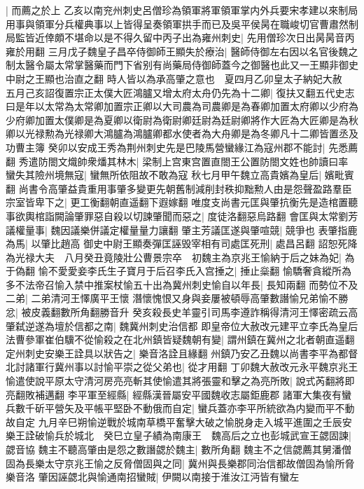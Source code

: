|{
	而薦之於上}
乙亥以南兖州刺史呂僧珍為領軍將軍領軍掌内外兵要宋孝建以來制局用事與領軍分兵權典事以上皆得呈奏領軍拱手而已及吳平侯昺在職峻切官曹肅然制局監皆近倖頗不堪命以是不得久留中丙子出為雍州刺史|{
	先用僧珍次日出昺昺音丙雍於用翻}
三月戊子魏皇子昌卒侍御師王顯失於療治|{
	醫師侍御左右因以名官後魏之制太醫令屬太常掌醫藥而門下省别有尚藥局侍御師蓋今之御醫也此又一王顯非御史中尉之王顯也治直之翻}
時人皆以為承高肇之意也　夏四月乙卯皇太子納妃大赦　五月己亥詔復置宗正太僕大匠鴻臚又增太府太舟仍先為十二卿|{
	復扶又翻五代史志曰是年以太常為太常卿加置宗正卿以大司農為司農卿是為春卿加置太府卿以少府為少府卿加置太僕卿是為夏卿以衛尉為衛尉卿廷尉為廷尉卿將作大匠為大匠卿是為秋卿以光禄勲為光禄卿大鴻臚為鴻臚卿都水使者為大舟卿是為冬卿凡十二卿皆置丞及功曹主簿}
癸卯以安成王秀為荆州刺史先是巴陵馬營蠻緣江為寇州郡不能討|{
	先悉薦翻}
秀遣防閤文熾帥衆燔其林木|{
	梁制上宫東宫置直閤王公置防閤文姓也帥讀曰率}
蠻失其險州境無寇|{
	蠻無所依阻故不敢為寇}
秋七月甲午魏立高貴嬪為皇后|{
	嬪毗賓翻}
尚書令高肇益貴重用事肇多變更先朝舊制減削封秩抑黜勲人由是怨聲盈路羣臣宗室皆卑下之|{
	更工衡翻朝直遥翻下遐嫁翻}
唯度支尚書元匡與肇抗衡先是造棺置聽事欲輿棺詣闕論肇罪惡自殺以切諫肇聞而惡之|{
	度徒洛翻惡烏路翻}
會匡與太常劉芳議權量事|{
	魏因議樂併議定權量量力讓翻}
肇主芳議匡遂與肇喧競|{
	競爭也}
表肇指鹿為馬|{
	以肇比趙高}
御史中尉王顯奏彈匡誣毁宰相有司處匡死刑|{
	處昌呂翻}
詔恕死降為光禄大夫　八月癸丑竟陵壯公曹景宗卒　初魏主為京兆王愉納于后之妹為妃|{
	為于偽翻}
愉不愛愛妾李氏生子寶月于后召李氏入宫捶之|{
	捶止橤翻}
愉驕奢貪縱所為多不法帝召愉入禁中推案杖愉五十出為冀州刺史愉自以年長|{
	長知兩翻}
而勢位不及二弟|{
	二弟清河王懌廣平王懷}
潛懷愧恨又身與妾屢被頓辱高肇數譖愉兄弟愉不勝忿|{
	被皮義翻數所角翻勝音升}
癸亥殺長史羊靈引司馬李遵詐稱得清河王懌密疏云高肇弑逆遂為壇於信都之南|{
	魏冀州刺史治信都}
即皇帝位大赦改元建平立李氏為皇后法曹參軍崔伯驥不從愉殺之在北州鎮皆疑魏朝有變|{
	謂州鎮在冀州之北者朝直遥翻}
定州刺史安樂王詮具以狀告之|{
	樂音洛詮且緣翻}
州鎮乃安乙丑魏以尚書李平為都督北討諸軍行冀州事以討愉平崇之從父弟也|{
	從才用翻}
丁卯魏大赦改元永平魏京兆王愉遣使說平原太守清河房亮亮斬其使愉遣其將張靈和擊之為亮所敗|{
	說式芮翻將即亮翻敗補邁翻}
李平軍至經縣|{
	經縣漢晉屬安平國魏收志屬鉅鹿郡}
諸軍大集夜有蠻兵數千斫平營矢及平帳平堅卧不動俄而自定|{
	蠻兵蓋亦李平所統欲為内變而平不動故自定}
九月辛巳朔愉逆戰於城南草橋平奮擊大破之愉脱身走入城平進圍之壬辰安樂王詮破愉兵於城北　癸巳立皇子績為南康王　魏高后之立也彭城武宣王勰固諫|{
	勰音協}
魏主不聽高肇由是怨之數譖勰於魏主|{
	數所角翻}
魏主不之信勰薦其舅潘僧固為長樂太守京兆王愉之反脅僧固與之同|{
	冀州與長樂郡同治信都故僧固為愉所脅樂音洛}
肇因誣勰北與愉通南招蠻賊|{
	伊闕以南接于淮汝江沔皆有蠻左}
